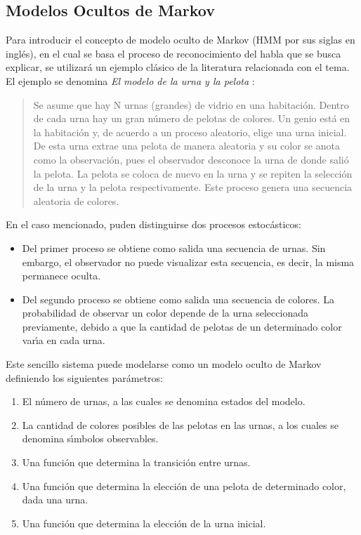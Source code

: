 \subsection{Modelos Ocultos de Markov}
\label{sec:hmm}

Para introducir el concepto de modelo oculto de Markov (HMM por sus siglas en ingl\'es), 
en el cual se basa el proceso de reconocimiento del habla que se busca explicar, 
se utilizar\'a un ejemplo cl\'asico de la literatura relacionada con el tema.
El ejemplo se denomina \emph{El modelo de la urna y la pelota} \cite{Rabiner89atutorial}:

\begin{quote}
	Se asume que hay N urnas (grandes) de vidrio en una habitaci\'on. Dentro de cada urna hay un gran 
	n\'umero de pelotas de colores.
	Un genio est\'a en la habitaci\'on y, de acuerdo a un proceso aleatorio, elige una urna inicial. 
	De esta urna extrae una pelota de manera aleatoria y su color se anota como la observaci\'on, 
	pues el observador desconoce la urna de donde sali\'o la pelota.
	La pelota se coloca de nuevo en la urna y se repiten la selecci\'on de la urna y la pelota respectivamente.
	Este proceso genera una secuencia aleatoria de colores.
\end{quote}

En el caso mencionado, puden distinguirse dos procesos estoc\'asticos:
\begin{itemize}
	\item Del primer proceso se obtiene como salida una secuencia de urnas. Sin embargo, el observador
	no puede visualizar esta secuencia, es decir, la misma permanece oculta.
	\item Del segundo proceso se obtiene como salida una secuencia de colores. La probabilidad de observar
	un color depende de la urna seleccionada previamente, debido a que la cantidad de pelotas de un determinado
	color var{\'\i}a en cada urna.
\end{itemize}

Este sencillo sistema puede modelarse como un modelo oculto de Markov definiendo los siguientes par\'ametros:
\begin{enumerate}
	\item El n\'umero de urnas, a las cuales se denomina estados del modelo.
	\item La cantidad de colores posibles de las pelotas en las urnas, a los cuales se 
	denomina s{\'\i}mbolos observables.
	\item Una funci\'on que determina la transici\'on entre urnas.
	\item Una funci\'on que determina la elecci\'on de una pelota de determinado color, dada una urna.
	\item Una funci\'on que determina la elecci\'on de la urna inicial.
\end{enumerate}

